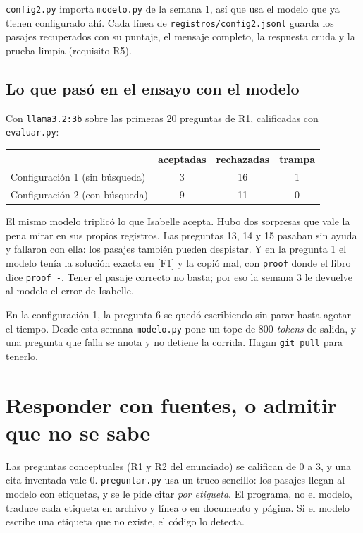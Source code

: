 \documentclass[11pt,a4paper]{article}
\newcommand{\cd}[1]{\texttt{\small #1}}
\begin{document}
\cd{config2.py} importa \cd{modelo.py} de la semana 1, así que usa el modelo
que ya tienen configurado ahí. Cada línea de \cd{registros/config2.jsonl}
guarda los pasajes recuperados con su puntaje, el mensaje completo, la
respuesta cruda y la prueba limpia (requisito R5).

\subsection{Lo que pasó en el ensayo con el modelo}

Con \cd{llama3.2:3b} sobre las primeras 20 preguntas de R1, calificadas con
\cd{evaluar.py}:

\begin{center}
\small
\begin{tabular}{@{}lccc@{}}
  \toprule
  & aceptadas & rechazadas & trampa \\
  \midrule
  Configuración 1 (sin búsqueda) & 3 & 16 & 1 \\
  Configuración 2 (con búsqueda) & 9 & 11 & 0 \\
  \bottomrule
\end{tabular}
\end{center}

El mismo modelo triplicó lo que Isabelle acepta. Hubo dos sorpresas que vale
la pena mirar en sus propios registros. Las preguntas 13, 14 y 15 pasaban sin
ayuda y fallaron con ella: los pasajes también pueden despistar. Y en la
pregunta 1 el modelo tenía la solución exacta en [F1] y la copió mal, con
\cd{proof} donde el libro dice \cd{proof -}. Tener el pasaje correcto no basta;
por eso la semana 3 le devuelve al modelo el error de Isabelle.

En la configuración 1, la pregunta 6 se quedó escribiendo sin parar hasta
agotar el tiempo. Desde esta semana \cd{modelo.py} pone un tope de 800
\emph{tokens} de salida, y una pregunta que falla se anota y no detiene la
corrida. Hagan \cd{git pull} para tenerlo.

\section{Responder con fuentes, o admitir que no se sabe}

Las preguntas conceptuales (R1 y R2 del enunciado) se califican de 0 a 3, y
una cita inventada vale 0. \cd{preguntar.py} usa un truco sencillo: los
pasajes llegan al modelo con etiquetas, y se le pide citar \emph{por
etiqueta}. El programa, no el modelo, traduce cada etiqueta en archivo y
línea o en documento y página. Si el modelo escribe una etiqueta que no
existe, el código lo detecta.
\end{document}
